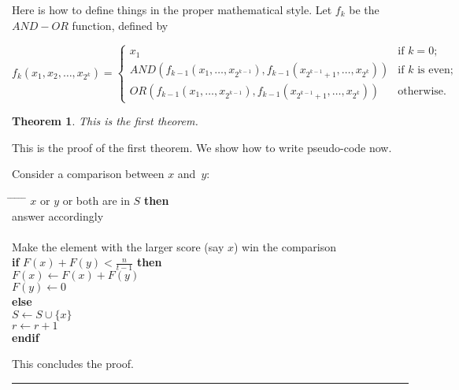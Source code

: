 \documentclass[twoside]{article}
\newcounter{lecnum}
\newtheorem{theorem}{Theorem}[lecnum]
\newenvironment{proof}{{\bf Proof:}}{\hfill\rule{2mm}{2mm}}
\begin{document}
	Here is how to define things in the proper mathematical style.
	Let $f_k$ be the $AND-OR$ function, defined by
	
	\[ f_k(x_1, x_2, \ldots, x_{2^k}) = \left\{ \begin{array}{ll}
	
	x_1 & \mbox{if $k = 0$;} \\
	
	AND(f_{k-1}(x_1, \ldots, x_{2^{k-1}}),
	f_{k-1}(x_{2^{k-1} + 1}, \ldots, x_{2^k}))
	& \mbox{if $k$ is even;} \\
	
	OR(f_{k-1}(x_1, \ldots, x_{2^{k-1}}),
	f_{k-1}(x_{2^{k-1} + 1}, \ldots, x_{2^k}))	
	& \mbox{otherwise.} 
	\end{array}
	\right. \]
	
	\begin{theorem}
		This is the first theorem.
	\end{theorem}
	
	\begin{proof}
		This is the proof of the first theorem. We show how to write pseudo-code now.
		
		Consider a comparison between $x$ and~$y$:
		\begin{tabbing}
			\hspace*{.25in} \= \hspace*{.25in} \= \hspace*{.25in} \= \hspace*{.25in} \= \hspace*{.25in} \=\kill
			 $x$ or $y$ or both are in $S$ {\bf then } \\
			\>\> answer accordingly \\
			 \\
			\>\>    Make the element with the larger score (say $x$) win the comparison \\
			\>\> {\bf if} $F(x) + F(y) < \frac{n}{t-1}$ {\bf then} \\%
			\>\>\> $F(x) \leftarrow F(x) + F(y)$ \\
			\>\>\> $F(y) \leftarrow 0$ \\
			\>\> {\bf else}  \\
			\>\>\> $S \leftarrow S \cup \{ x \} $ \\
			\>\>\> $r \leftarrow r+1$ \\
			\>\> {\bf endif} \\
		\end{tabbing}
		
		This concludes the proof.
	\end{proof}
	
\end{document}
